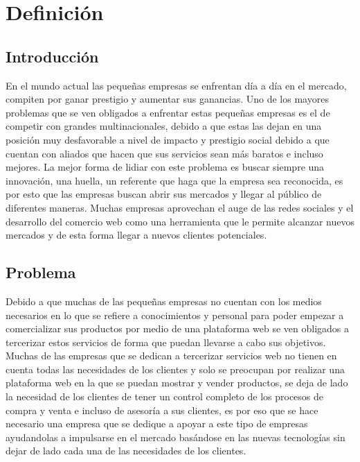 \chapter{Definición}


\section{Introducción}

En el mundo actual las pequeñas empresas se enfrentan día a día en el mercado, compiten por ganar prestigio y aumentar sus ganancias. Uno de los mayores problemas que se ven obligados a enfrentar estas pequeñas empresas es el de competir con grandes multinacionales, debido a que estas las dejan en una posición muy desfavorable a nivel de impacto y prestigio social debido a que cuentan con aliados que hacen que sus servicios sean más baratos e incluso mejores.
\newline
La mejor forma de lidiar con este problema es buscar siempre una innovación, una huella, un referente que haga que la empresa sea reconocida, es por esto que las empresas buscan abrir sus mercados y llegar al público de diferentes maneras. Muchas empresas aprovechan el auge de las redes sociales y el desarrollo del comercio web como una herramienta que le permite alcanzar nuevos mercados y de esta forma llegar a nuevos clientes potenciales.
\newline

\newpage

\section{Problema}

Debido a que muchas de las pequeñas empresas no cuentan con los medios necesarios en lo que se refiere a conocimientos y personal para poder empezar a comercializar sus productos por medio de una plataforma web se ven obligados a tercerizar estos servicios de forma que puedan llevarse a cabo sus objetivos.
\newline
Muchas de las empresas que se dedican a tercerizar servicios web no tienen en cuenta todas las necesidades de los clientes y solo se preocupan por realizar una plataforma web en la que se puedan mostrar y vender productos, se deja de lado la necesidad de los clientes de tener un control completo de los procesos de compra y venta e incluso de asesoría a sus clientes, es por eso que se hace necesario una empresa que se dedique a apoyar a este tipo de empresas ayudandolas a impulsarse en el mercado basándose en las nuevas tecnologías sin dejar de lado cada una de las necesidades de los clientes.

